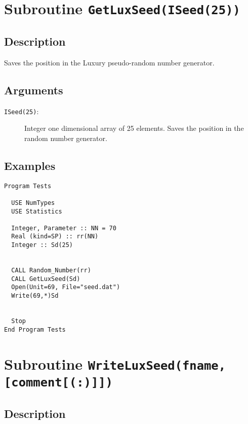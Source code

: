 \section{Subroutine \texttt{GetLuxSeed(ISeed(25))}}

\subsection{Description}

Saves the position in the Luxury pseudo-random number generator. 

\subsection{Arguments}

\begin{description}
\item[\texttt{ISeed(25)}:] Integer one dimensional array of 25
  elements. Saves the position in the random number generator.
\end{description}

\subsection{Examples}

\begin{lstlisting}[emph=GetLuxSeed,
                   emphstyle=\color{blue},
                   frame=trBL,
                   caption=Saving a point in the generating process.,
                   label=getluxseed]
Program Tests

  USE NumTypes 
  USE Statistics

  Integer, Parameter :: NN = 70
  Real (kind=SP) :: rr(NN)
  Integer :: Sd(25)


  CALL Random_Number(rr)
  CALL GetLuxSeed(Sd)
  Open(Unit=69, File="seed.dat")
  Write(69,*)Sd

  
  Stop
End Program Tests
\end{lstlisting}

\section{Subroutine \texttt{WriteLuxSeed(fname,[comment[(:)]])}}

\subsection{Description}

